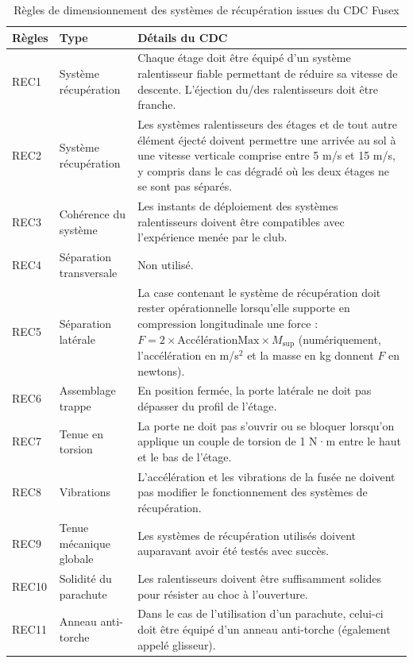 \begin{table}[h!]
    \centering
    \begin{tabular}{|p{1.2cm}|p{4cm}|p{10cm}|}
        \hline
        Règles & Type & Détails du \acrshort{CDC} \\ \hline
        REC1  & Système récupération & Chaque étage doit être équipé d’un système ralentisseur fiable permettant de réduire sa vitesse de descente. L’éjection du/des ralentisseurs doit être franche. \\ \hline
        REC2  & Système récupération & Les systèmes ralentisseurs des étages et de tout autre élément éjecté doivent permettre une arrivée au sol à une vitesse verticale comprise entre 5 m/s et 15 m/s, y compris dans le cas dégradé où les deux étages ne se sont pas séparés. \\ \hline
        REC3  & Cohérence du système & Les instants de déploiement des systèmes ralentisseurs doivent être compatibles avec l’expérience menée par le club. \\ \hline
        REC4  & Séparation transversale & Non utilisé. \\ \hline
        REC5  & Séparation latérale & La case contenant le système de récupération doit rester opérationnelle lorsqu’elle supporte en compression longitudinale une force : $F = 2 \times \text{Accélération}{\text{Max}} \times M_{\text{sup}}$ (numériquement, l’accélération en m/s$^2$ et la masse en kg donnent $F$ en newtons). \\ \hline
        REC6  & Assemblage trappe & En position fermée, la porte latérale ne doit pas dépasser du profil de l’étage. \\ \hline
        REC7  & Tenue en torsion & La porte ne doit pas s’ouvrir ou se bloquer lorsqu’on applique un couple de torsion de 1 N·m entre le haut et le bas de l’étage. \\ \hline
        REC8  & Vibrations & L’accélération et les vibrations de la fusée ne doivent pas modifier le fonctionnement des systèmes de récupération. \\ \hline
        REC9  & Tenue mécanique globale & Les systèmes de récupération utilisés doivent auparavant avoir été testés avec succès. \\ \hline
        REC10 & Solidité du parachute & Les ralentisseurs doivent être suffisamment solides pour résister au choc à l’ouverture. \\ \hline
        REC11 & Anneau anti-torche & Dans le cas de l’utilisation d’un parachute, celui-ci doit être équipé d’un anneau anti-torche (également appelé glisseur). \\ \hline
    \end{tabular}
    \caption{Règles de dimensionnement des systèmes de récupération issues du \acrshort{CDC} \gls{Fusex} \cite[p.~36-42]{CDC_BiEtage}}
\end{table}

